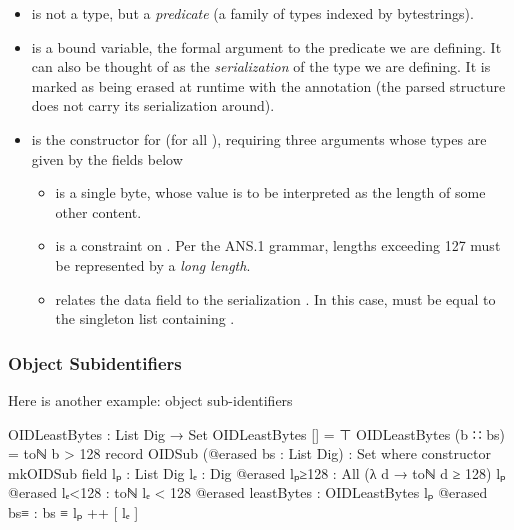 \documentclass[11pt]{article}
\begin{document}
\begin{itemize}
\item {} is not a type, but a \emph{predicate} (a family of types
indexed by bytestrings).
\item {} is a bound variable, the formal argument to the predicate we
are defining.
It can also be thought of as the \emph{serialization} of the type we are
defining.
It is marked as being erased at runtime with the 
annotation (the parsed structure does not carry its serialization around).
\item {} is the constructor for
\AgdaSpace{} (for all ),
requiring three arguments whose types are given by the fields below
\begin{itemize}
\item {} is a single byte, whose value is to be interpreted as the
length of some other content.

\item {} is a constraint on . Per the ANS.1 grammar,
lengths exceeding 127 must be represented by a \emph{long length}.

\item {} relates the data field  to the serialization
.
In this case,  must be equal to the singleton list
containing .
\end{itemize}
\end{itemize}

\subsubsection{Object Subidentifiers}
\label{sec:org685880a}
Here is another example: object sub-identifiers

\begin{code}
OIDLeastBytes : List Dig → Set
OIDLeastBytes [] = ⊤
OIDLeastBytes (b  ∷ bs) = toℕ b > 128
record OIDSub (@erased bs : List Dig) : Set where
  constructor mkOIDSub
  field
    lₚ : List Dig
    lₑ : Dig
    @erased lₚ≥128 : All (λ d → toℕ d ≥ 128) lₚ
    @erased lₑ<128 : toℕ lₑ < 128
    @erased leastBytes : OIDLeastBytes lₚ
    @erased bs≡ : bs ≡ lₚ ++ [ lₑ ]
\end{code}
\end{document}
